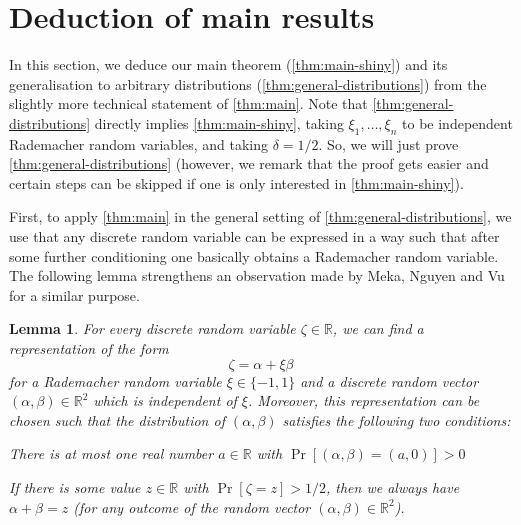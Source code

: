 \documentclass[english]{article}
\newtheorem{lemma}[theorem]{Lemma}
\theoremstyle{remark}
\numberwithin{equation}{section}
\numberwithin{figure}{section}
\newcommand{\RR}{\mathbb{R}}
\begin{document}
\section{Deduction of main results}\label{sec:arbitrary-distributions}
In this section, we deduce our main theorem (\cref{thm:main-shiny}) and its generalisation to arbitrary distributions (\cref{thm:general-distributions}) from the slightly more technical statement of \cref{thm:main}. Note that \cref{thm:general-distributions} directly implies \cref{thm:main-shiny}, taking $\xi_{1},\dots,\xi_{n}$ to be independent Rademacher random variables, and taking $\delta=1/2$. So, we will just prove \cref{thm:general-distributions} (however, we remark that the proof gets easier and certain steps can be skipped if one is only interested in \cref{thm:main-shiny}).

First, to apply \cref{thm:main} in the general setting of \cref{thm:general-distributions}, we use that any discrete random variable can be expressed in a way such that after some further conditioning one basically obtains a  Rademacher random variable. 
The following lemma strengthens an observation made by Meka,
Nguyen and Vu~\cite{MNV16} for a similar purpose.
\begin{lemma}\label{lem-representation}
For every discrete random variable $\zeta\in \RR$, we can find a representation of the form
\[\zeta=\alpha+\xi \beta\]
for a Rademacher random variable $\xi\in\{-1,1\}$ and a discrete random vector $(\alpha,\beta)\in \RR^2$ which is independent of $\xi$.
Moreover, this representation can be chosen such that the distribution of $(\alpha,\beta)$ satisfies the following two conditions:
\begin{compactenum}
\item [(a)] There is at most one real number $a\in \RR$ with $\Pr[(\alpha,\beta)=(a,0)]>0$
\item [(b)] If there is some value $z\in \RR$ with $\Pr[\zeta=z]>1/2$, then we always have $\alpha+\beta=z$ (for any outcome of the random vector $(\alpha,\beta)\in \RR^2$).
\end{compactenum} 
\end{lemma}
\end{document}
